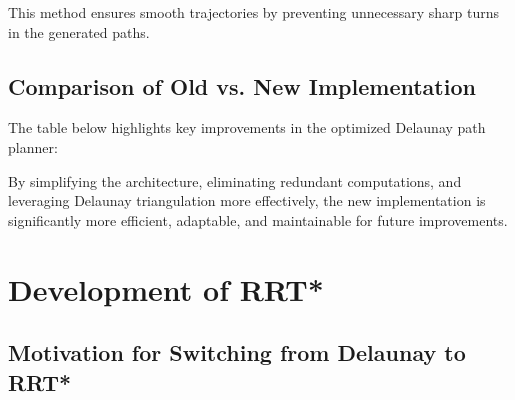 \documentclass[a4paper,11pt]{report}
\begin{document}
This method ensures smooth trajectories by preventing unnecessary sharp turns in the generated paths.

\subsection{Comparison of Old vs. New Implementation}
The table below highlights key improvements in the optimized Delaunay path planner:

\begin{table}[h]
    \centering
    \caption{Comparison between the old and new Delaunay path planners.}
    \label{tab:delaunay_comparison}
\end{table}

By simplifying the architecture, eliminating redundant computations, and leveraging Delaunay triangulation more effectively, the new implementation is significantly more efficient, adaptable, and maintainable for future improvements.

\section{Development of RRT*}
\subsection{Motivation for Switching from Delaunay to RRT*}
\end{document}
